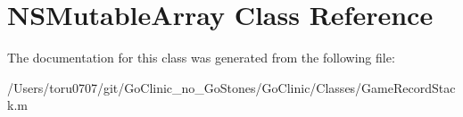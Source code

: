 \hypertarget{class_n_s_mutable_array}{
\section{NSMutableArray Class Reference}
\label{class_n_s_mutable_array}
}


The documentation for this class was generated from the following file:\begin{DoxyCompactItemize}
\item 
/Users/toru0707/git/GoClinic\_\-no\_\-GoStones/GoClinic/Classes/GameRecordStack.m\end{DoxyCompactItemize}
